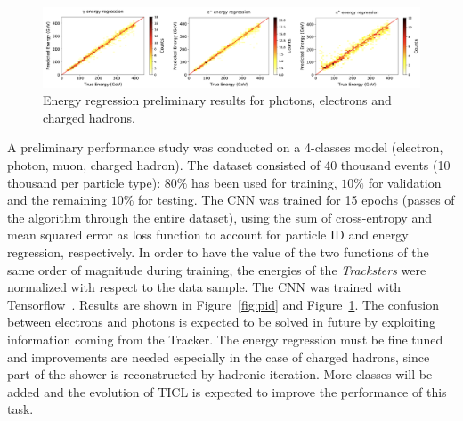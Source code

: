\begin{figure}[h]
    \centering
    \includegraphics[width=.99\textwidth]{chapters/HGCal/figures/chef/er}
    \caption{\label{fig:er} Energy regression preliminary results for photons, electrons and charged hadrons.}
\end{figure}

A preliminary performance study was conducted on a 4-classes model (electron, photon, muon, charged hadron). The dataset consisted of 40 thousand events (10 thousand per particle type): $80\%$ has been used for training, $10\%$ for validation and the remaining $10\%$ for testing. The CNN was trained for 15 epochs (passes of the algorithm through the entire dataset), using the sum of cross-entropy and mean squared error as loss function to account for particle ID and energy regression, respectively. In order to have the value of the two functions of the same order of magnitude during training, the energies of the \emph{Tracksters} were normalized with respect to the data sample. The CNN was trained with Tensorflow~\cite{7}. Results are shown in Figure~\ref{fig:pid} and Figure~\ref{fig:er}. The confusion between electrons and photons is expected to be solved in future by exploiting information coming from the Tracker. The energy regression must be fine tuned and improvements are needed especially in the case of charged hadrons, since part of the shower is reconstructed by hadronic iteration. More classes will be added and the evolution of TICL is expected to improve the performance of this task.

